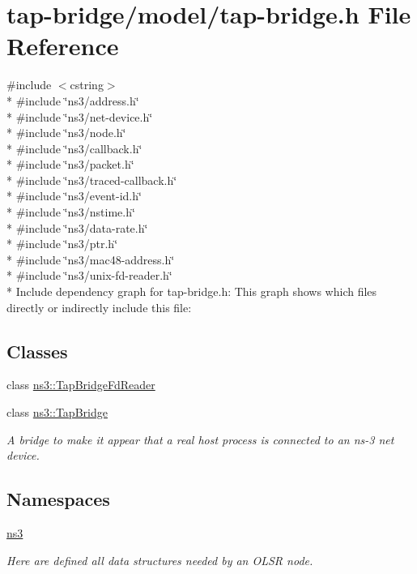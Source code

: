 \hypertarget{tap-bridge_8h}{}\section{tap-\/bridge/model/tap-\/bridge.h File Reference}
\label{tap-bridge_8h}
{\ttfamily \#include $<$cstring$>$}\\*
{\ttfamily \#include \char`\"{}ns3/address.\+h\char`\"{}}\\*
{\ttfamily \#include \char`\"{}ns3/net-\/device.\+h\char`\"{}}\\*
{\ttfamily \#include \char`\"{}ns3/node.\+h\char`\"{}}\\*
{\ttfamily \#include \char`\"{}ns3/callback.\+h\char`\"{}}\\*
{\ttfamily \#include \char`\"{}ns3/packet.\+h\char`\"{}}\\*
{\ttfamily \#include \char`\"{}ns3/traced-\/callback.\+h\char`\"{}}\\*
{\ttfamily \#include \char`\"{}ns3/event-\/id.\+h\char`\"{}}\\*
{\ttfamily \#include \char`\"{}ns3/nstime.\+h\char`\"{}}\\*
{\ttfamily \#include \char`\"{}ns3/data-\/rate.\+h\char`\"{}}\\*
{\ttfamily \#include \char`\"{}ns3/ptr.\+h\char`\"{}}\\*
{\ttfamily \#include \char`\"{}ns3/mac48-\/address.\+h\char`\"{}}\\*
{\ttfamily \#include \char`\"{}ns3/unix-\/fd-\/reader.\+h\char`\"{}}\\*
Include dependency graph for tap-\/bridge.h\+:
This graph shows which files directly or indirectly include this file\+:
\subsection*{Classes}
\begin{DoxyCompactItemize}
\item 
class \hyperlink{classns3_1_1TapBridgeFdReader}{ns3\+::\+Tap\+Bridge\+Fd\+Reader}
\item 
class \hyperlink{classns3_1_1TapBridge}{ns3\+::\+Tap\+Bridge}
\begin{DoxyCompactList}\small\item\em A bridge to make it appear that a real host process is connected to an ns-\/3 net device. \end{DoxyCompactList}\end{DoxyCompactItemize}
\subsection*{Namespaces}
\begin{DoxyCompactItemize}
\item 
 \hyperlink{namespacens3}{ns3}
\begin{DoxyCompactList}\small\item\em Here are defined all data structures needed by an O\+L\+SR node. \end{DoxyCompactList}\end{DoxyCompactItemize}
